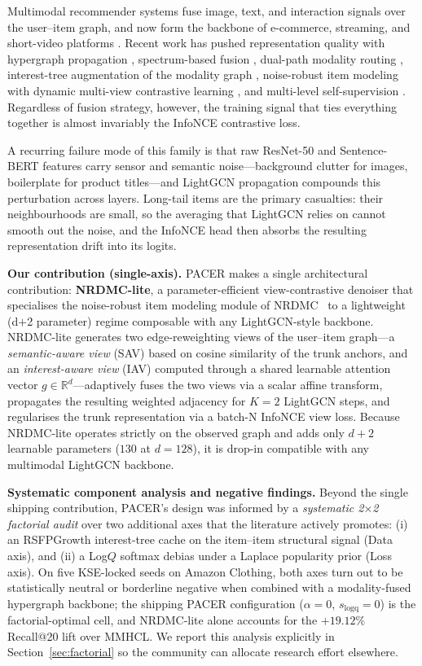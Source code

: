 \documentclass[conference]{IEEEtran}
\begin{document}
Multimodal recommender systems fuse image, text, and interaction
signals over the user--item graph, and now form the backbone of
e-commerce, streaming, and short-video platforms
\cite{guo2025mmhcl,li2026multiview,hao2026itcohd}. Recent work has
pushed representation quality with hypergraph propagation
\cite{guo2025mmhcl,hao2026itcohd}, spectrum-based fusion
\cite{ong2025spectrum,wang2026damps}, dual-path modality routing
\cite{yan2025compensating}, interest-tree augmentation of the modality
graph \cite{meng2025tamer}, noise-robust item modeling with dynamic
multi-view contrastive learning \cite{gong2026noise}, and multi-level
self-supervision \cite{xu2025mentor}. Regardless of fusion strategy,
however, the training signal that ties everything together is almost
invariably the InfoNCE contrastive loss.

A recurring failure mode of this family is that raw ResNet-50 and
Sentence-BERT features carry sensor and semantic noise---background
clutter for images, boilerplate for product titles---and
LightGCN propagation compounds this perturbation across layers.
Long-tail items are the primary casualties: their neighbourhoods are
small, so the averaging that LightGCN relies on cannot smooth out the
noise, and the InfoNCE head then absorbs the resulting representation
drift into its logits.

\smallskip
\noindent\textbf{Our contribution (single-axis).}
PACER makes a single architectural contribution: \textbf{NRDMC-lite},
a parameter-efficient view-contrastive denoiser that specialises the
noise-robust item modeling module of NRDMC~\cite{gong2026noise} to a
lightweight (d${+}$2 parameter) regime composable with any
LightGCN-style backbone. NRDMC-lite generates two edge-reweighting
views of the user--item graph---a \emph{semantic-aware view} (SAV)
based on cosine similarity of the trunk anchors, and an
\emph{interest-aware view} (IAV) computed through a shared learnable
attention vector $g\in\mathbb{R}^{d}$---adaptively fuses the two
views via a scalar affine transform, propagates the resulting
weighted adjacency for $K{=}2$ LightGCN steps, and regularises the
trunk representation via a batch-N InfoNCE view loss. Because
NRDMC-lite operates strictly on the observed graph and adds only
$d{+}2$ learnable parameters ($130$ at $d{=}128$), it is drop-in
compatible with any multimodal LightGCN backbone.

\smallskip
\noindent\textbf{Systematic component analysis and negative findings.}
Beyond the single shipping contribution, PACER's design was informed
by a \emph{systematic 2$\times$2 factorial audit} over two additional
axes that the literature actively promotes: (i) an RSFPGrowth
interest-tree cache on the item--item structural signal (Data axis),
and (ii) a Log$Q$ softmax debias under a Laplace popularity prior
(Loss axis). On five KSE-locked seeds on Amazon Clothing, both axes
turn out to be statistically neutral or borderline negative when
combined with a modality-fused hypergraph backbone; the shipping
PACER configuration ($\alpha{=}0$, $s_{\text{logq}}{=}0$) is the
factorial-optimal cell, and NRDMC-lite alone accounts for the
$+19.12\%$ Recall@20 lift over MMHCL. We report this analysis
explicitly in Section~\ref{sec:factorial} so the community can allocate
research effort elsewhere.
\end{document}
